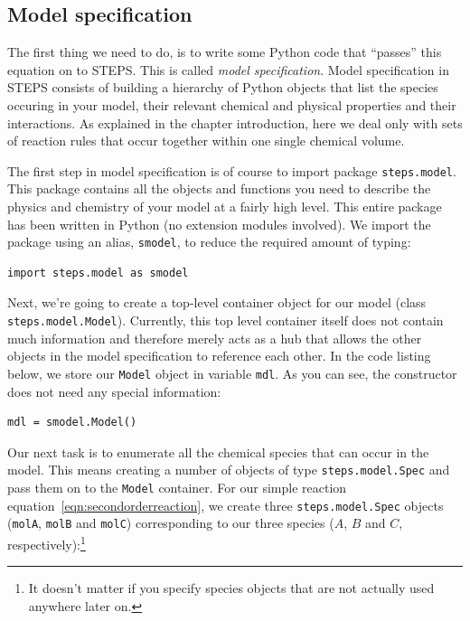 \documentclass[a4paper,12pt]{book}
\begin{document}
\subsection{Model specification}

The first thing we need to do, is to write some Python code that ``passes'' this equation on to STEPS. This is called \emph{model specification}. Model specification in STEPS consists of building a hierarchy of Python objects that list the species occuring in your model, their relevant chemical and physical properties and their interactions. As explained in the chapter introduction, here we deal only with sets of reaction rules that occur together within one single chemical volume. 

The first step in model specification is of course to import package \texttt{steps.model}. This package contains all the objects and functions you need to describe the physics and chemistry of your model at a fairly high level. This entire package has been written in Python (no extension modules involved). We import the package using an alias, \texttt{smodel}, to reduce the required amount of typing:

\begin{verbatim}
import steps.model as smodel
\end{verbatim}

Next, we're going to create a top-level container object for our model (class \texttt{steps.model.Model}). Currently, this top level container itself does not contain much information and therefore merely acts as a hub that allows the other objects in the model specification to reference each other. In the code listing below, we store our \texttt{Model} object in variable \texttt{mdl}. As you can see, the constructor does not need any special information:

\begin{verbatim}
mdl = smodel.Model()
\end{verbatim}

Our next task is to enumerate all the chemical species that can occur in the model. This means creating a number of objects of type \texttt{steps.model.Spec} and pass them on to the \texttt{Model} container. For our simple reaction equation~\ref{eqn:secondorderreaction}, we create three \texttt{steps.model.Spec} objects (\texttt{molA}, \texttt{molB} and \texttt{molC}) corresponding to our three species ($A$, $B$ and $C$, respectively):\footnote{It doesn't matter if you specify species objects that are not actually used anywhere later on.}
\end{document}
